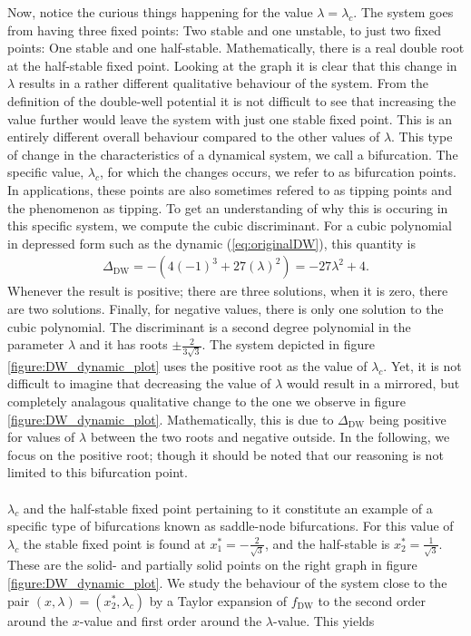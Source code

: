 Now, notice the curious things happening for the value $\lambda = \lambda_c$. The system goes from having three fixed points: Two stable and one unstable, to just two fixed points: One stable and one half-stable. Mathematically, there is a real double root at the half-stable fixed point. Looking at the graph it is clear that this change in $\lambda$ results in a rather different qualitative behaviour of the system. From the definition of the double-well potential it is not difficult to see that increasing the value further would leave the system with just one stable fixed point. This is an entirely different overall behaviour compared to the other values of $\lambda$. This type of change in the characteristics of a dynamical system, we call a bifurcation. The specific value, $\lambda_c$, for which the changes occurs, we refer to as bifurcation points.\cite{Strogatz2019_gv} In applications, these points are also sometimes refered to as tipping points and the phenomenon as tipping.
To get an understanding of why this is occuring in this specific system, we compute the cubic discriminant. For a cubic polynomial in depressed form such as the dynamic (\ref{eq:originalDW}), this quantity is
\begin{align}
    \Delta_{\mathrm{DW}} = -\left(4(-1)^3+27\left(\lambda\right)^2\right) = -27\lambda^2 + 4. \label{eq:DW_discriminant}
\end{align} 
Whenever the result is positive; there are three solutions, when it is zero, there are two solutions. Finally, for negative values, there is only one solution to the cubic polynomial. The discriminant is a second degree polynomial in the parameter $\lambda$ and it has roots $\pm \frac{2}{3\sqrt{3}}$. The system depicted in figure \ref{figure:DW_dynamic_plot} uses the positive root as the value of $\lambda_c$. Yet, it is not difficult to imagine that decreasing the value of $\lambda$ would result in a mirrored, but completely analagous qualitative change to the one we observe in figure \ref{figure:DW_dynamic_plot}. Mathematically, this is due to $\Delta_{\mathrm{DW}}$ being positive for values of $\lambda$ between the two roots and negative outside. In the following, we focus on the positive root; though it should be noted that our reasoning is not limited to this bifurcation point. \\\\
$\lambda_c$ and the half-stable fixed point pertaining to it constitute an example of a specific type of bifurcations known as saddle-node bifurcations. For this value of $\lambda_c$ the stable fixed point is found at $x_1^* = -\frac{2}{\sqrt{3}}$, and the half-stable is $x_2^* = \frac{1}{\sqrt{3}}$. These are the solid- and partially solid points on the right graph in figure \ref{figure:DW_dynamic_plot}. We study the behaviour of the system close to the pair $(x, \lambda) = (x_2^*, \lambda_c)$ by a Taylor expansion of $f_{\mathrm{DW}}$ to the second order around the $x$-value and first order around the $\lambda$-value. This yields
